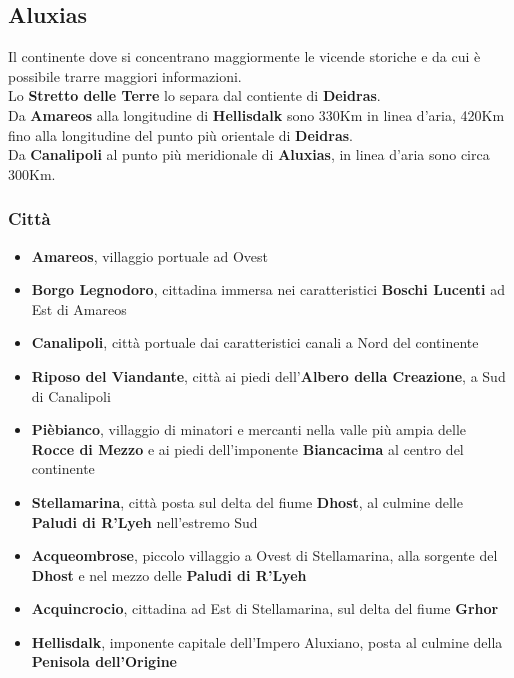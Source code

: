 \documentclass[10pt,twoside,onecolumn,openany]{book}
\begin{document}
\subsection{Aluxias}
Il continente dove si concentrano maggiormente le vicende storiche e da cui è possibile trarre maggiori informazioni.\\ Lo \textbf{Stretto delle Terre} lo separa dal contiente di \textbf{Deidras}.\\
Da \textbf{Amareos} alla longitudine di \textbf{Hellisdalk} sono 330Km in linea d'aria, 420Km fino alla longitudine del punto più orientale di \textbf{Deidras}.\\
Da \textbf{Canalipoli} al punto più meridionale di \textbf{Aluxias}, in linea d'aria sono circa 300Km.
\begin{multicols}{2}
\subsubsection{Città}
\begin{itemize}
\item \textbf{Amareos}, villaggio portuale ad Ovest
\item \textbf{Borgo Legnodoro}, cittadina immersa nei caratteristici \textbf{Boschi Lucenti} ad Est di Amareos
\item \textbf{Canalipoli}, città portuale dai caratteristici canali a Nord del continente
\item \textbf{Riposo del Viandante}, città ai piedi dell'\textbf{Albero della Creazione}, a Sud di Canalipoli
\item \textbf{Pièbianco}, villaggio di minatori e mercanti nella valle più ampia delle \textbf{Rocce di Mezzo} e ai piedi dell'imponente \textbf{Biancacima} al centro del continente
\item \textbf{Stellamarina}, città posta sul delta del fiume \textbf{Dhost}, al culmine delle \textbf{Paludi di R'Lyeh} nell'estremo Sud
\item \textbf{Acqueombrose}, piccolo villaggio a Ovest di Stellamarina, alla sorgente del \textbf{Dhost} e nel mezzo delle \textbf{Paludi di R'Lyeh}
\item \textbf{Acquincrocio}, cittadina ad Est di Stellamarina, sul delta del fiume \textbf{Grhor}
\item \textbf{Hellisdalk}, imponente capitale dell'Impero Aluxiano, posta al culmine della \textbf{Penisola dell'Origine}
\end{itemize}
\columnbreak

\end{multicols}
\end{document}
